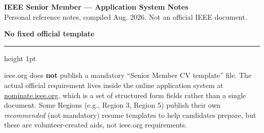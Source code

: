 \documentclass[10.5pt]{article}
\newcommand{\cvsection}[1]{%
  \vspace{10pt}
  {\color{accent}\Large\bfseries #1}\par
  \vspace{2pt}
  {\color{accent}\hrule height 1pt}
  \vspace{6pt}
}
\begin{document}
\begin{center}
  {\fontsize{18}{22}\selectfont\bfseries IEEE Senior Member --- Application System Notes}\\[4pt]
  {\small\color{muted} Personal reference notes, compiled Aug. 2026. Not an official IEEE document.}
\end{center}

\cvsection{No fixed official template}
ieee.org does \textbf{not} publish a mandatory ``Senior Member CV template'' file. The actual official requirement lives inside the online application system at \href{https://nominate.ieee.org}{nominate.ieee.org}, which is a set of structured form fields rather than a single document. Some Regions (e.g., Region 3, Region 5) publish their own \textit{recommended} (not mandatory) resume templates to help candidates prepare, but these are volunteer-created aids, not ieee.org requirements.
\end{document}
